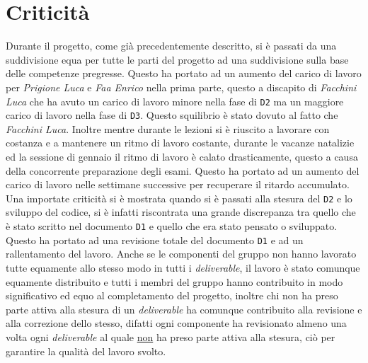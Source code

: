\chapter{Criticità}
Durante il progetto, come già precedentemente descritto, si è passati da una suddivisione equa per tutte le parti del progetto ad una suddivisione sulla base delle competenze pregresse. Questo ha portato ad un aumento del carico di lavoro per \textit{Prigione Luca} e \textit{Faa Enrico} nella prima parte, questo a discapito di \textit{Facchini Luca} che ha avuto un carico di lavoro minore nella fase di \texttt{D2} ma un maggiore carico di lavoro nella fase di \texttt{D3}. Questo squilibrio è stato dovuto al fatto che \textit{Facchini Luca}. Inoltre mentre durante le lezioni si è riuscito a lavorare con costanza e a mantenere un ritmo di lavoro costante, durante le vacanze natalizie ed la sessione di gennaio il ritmo di lavoro è calato drasticamente, questo a causa della concorrente preparazione degli esami. Questo ha portato ad un aumento del carico di lavoro nelle settimane successive per recuperare il ritardo accumulato.\newline
Una importate criticità si è mostrata quando si è passati alla stesura del \texttt{D2} e lo sviluppo del codice, si è infatti riscontrata una grande discrepanza tra quello che è stato scritto nel documento \texttt{D1} e quello che era stato pensato o sviluppato. Questo ha portato ad una revisione totale del documento \texttt{D1} e ad un rallentamento del lavoro. \newline
Anche se le componenti del gruppo non hanno lavorato tutte equamente allo stesso modo in tutti i \textit{deliverable}, il lavoro è stato comunque equamente distribuito e tutti i membri del gruppo hanno contribuito in modo significativo ed equo al completamento del progetto, inoltre chi non ha preso parte attiva alla stesura di un \textit{deliverable} ha comunque contribuito alla revisione e alla correzione dello stesso, difatti ogni componente ha revisionato almeno una volta ogni \textit{deliverable} al quale \underline{non} ha preso parte attiva alla stesura, ciò per garantire la qualità del lavoro svolto.